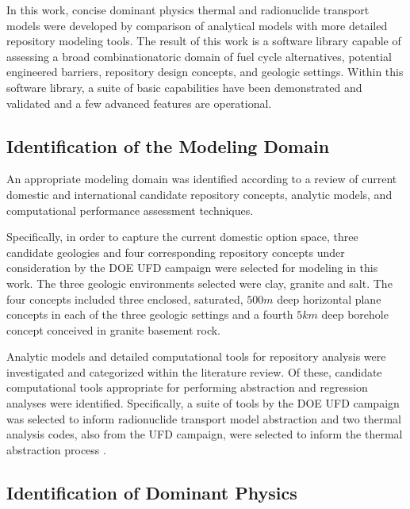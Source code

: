 
In this work, concise dominant physics thermal and radionuclide transport models 
were developed by comparison of analytical models with more detailed repository 
modeling tools. The result of this work is a software library capable 
of assessing a broad combinationatoric domain of fuel cycle alternatives, potential 
engineered barriers, repository design concepts, and geologic settings. Within 
this software library, a suite of basic capabilities have been demonstrated and 
validated and a few advanced features are operational. 

\subsection{Identification of the Modeling Domain}

An appropriate modeling domain was identified according to a review of current 
domestic and international candidate repository concepts, analytic models, and 
computational performance assessment techniques.  

Specifically, in order to capture the current domestic option space, three 
candidate geologies and four corresponding repository concepts under 
consideration by the \gls{DOE} \gls{UFD} campaign were selected for modeling in 
this work. The three geologic environments selected were clay, granite and salt.  
The four concepts included three enclosed, saturated, $500m$ deep horizontal 
plane concepts in each of the three geologic settings and a fourth $5km$ deep 
borehole concept conceived in granite basement rock.


Analytic models and detailed computational tools for repository analysis were 
investigated and categorized within the literature review.  Of these, candidate 
computational tools appropriate for performing abstraction and regression 
analyses were identified. Specifically, a suite of  tools by the 
\gls{DOE} \gls{UFD} campaign was selected to inform radionuclide transport model 
abstraction\cite{GDSM} and two thermal analysis codes, also from the \gls{UFD} 
campaign, were selected to inform the thermal abstraction process 
\cite{huff_thermal_2012, greenberg_application_2011}.


\subsection{Identification of Dominant Physics}

